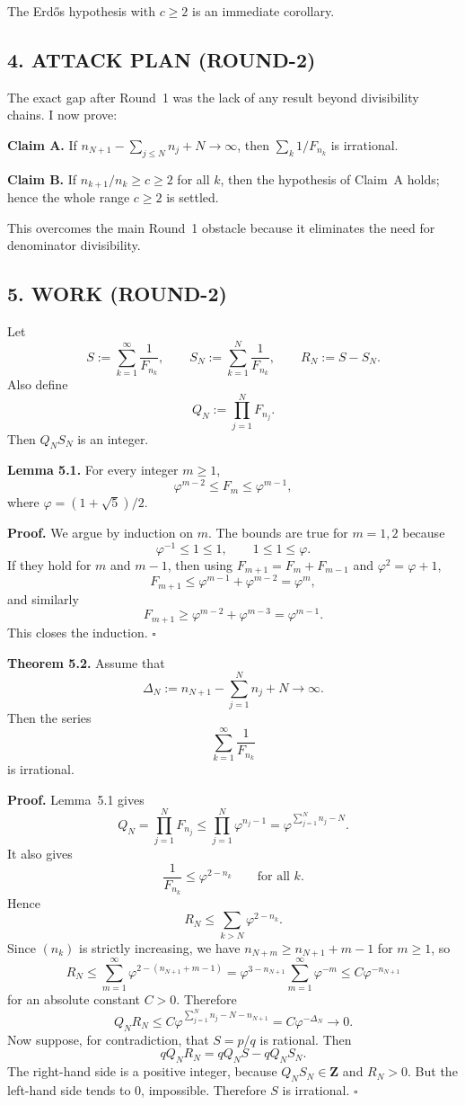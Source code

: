 The Erd\H{o}s hypothesis with $c\ge 2$ is an immediate corollary.

\subsection*{4. ATTACK PLAN (ROUND-2)}

The exact gap after Round~1 was the lack of any result beyond divisibility chains.  I now prove:

\medskip
\noindent
\textbf{Claim A.}
If $n_{N+1}-\sum_{j\le N}n_j+N\to\infty$, then $\sum_k 1/F_{n_k}$ is irrational.

\medskip
\noindent
\textbf{Claim B.}
If $n_{k+1}/n_k\ge c\ge 2$ for all $k$, then the hypothesis of Claim~A holds; hence the whole range $c\ge 2$ is settled.

This overcomes the main Round~1 obstacle because it eliminates the need for denominator divisibility.

\subsection*{5. WORK (ROUND-2)}

Let
\[
S:=\sum_{k=1}^{\infty}\frac{1}{F_{n_k}},
\qquad
S_N:=\sum_{k=1}^{N}\frac{1}{F_{n_k}},
\qquad
R_N:=S-S_N.
\]
Also define
\[
Q_N:=\prod_{j=1}^{N}F_{n_j}.
\]
Then $Q_N S_N$ is an integer.

\medskip
\noindent
\textbf{Lemma 5.1.}
For every integer $m\ge 1$,
\[
\varphi^{m-2}\le F_m\le \varphi^{m-1},
\]
where $\varphi=(1+\sqrt5)/2$.

\medskip
\noindent
\textbf{Proof.}
We argue by induction on $m$.  The bounds are true for $m=1,2$ because
\[
\varphi^{-1}\le 1\le 1,
\qquad
1\le 1\le \varphi.
\]
If they hold for $m$ and $m-1$, then using $F_{m+1}=F_m+F_{m-1}$ and $\varphi^2=\varphi+1$,
\[
F_{m+1}\le \varphi^{m-1}+\varphi^{m-2}=\varphi^m,
\]
and similarly
\[
F_{m+1}\ge \varphi^{m-2}+\varphi^{m-3}=\varphi^{m-1}.
\]
This closes the induction.
\hfill $\square$

\medskip
\noindent
\textbf{Theorem 5.2.}
Assume that
\[
\Delta_N:=n_{N+1}-\sum_{j=1}^{N}n_j+N \to \infty.
\]
Then the series
\[
\sum_{k=1}^{\infty}\frac{1}{F_{n_k}}
\]
is irrational.

\medskip
\noindent
\textbf{Proof.}
Lemma~5.1 gives
\[
Q_N=\prod_{j=1}^{N}F_{n_j}
\le \prod_{j=1}^{N}\varphi^{n_j-1}
=\varphi^{\sum_{j=1}^{N}n_j-N}.
\]
It also gives
\[
\frac{1}{F_{n_k}}\le \varphi^{2-n_k}
\qquad\mbox{for all }k.
\]
Hence
\[
R_N\le \sum_{k>N}\varphi^{2-n_k}.
\]
Since $(n_k)$ is strictly increasing, we have $n_{N+m}\ge n_{N+1}+m-1$ for $m\ge 1$, so
\[
R_N
\le \sum_{m=1}^{\infty}\varphi^{2-(n_{N+1}+m-1)}
=\varphi^{3-n_{N+1}}\sum_{m=1}^{\infty}\varphi^{-m}
\le C\varphi^{-n_{N+1}}
\]
for an absolute constant $C>0$.
Therefore
\[
Q_N R_N
\le C\varphi^{\sum_{j=1}^{N}n_j-N-n_{N+1}}
= C\varphi^{-\Delta_N}
\to 0.
\]
Now suppose, for contradiction, that $S=p/q$ is rational.  Then
\[
qQ_N R_N=qQ_N S-qQ_N S_N.
\]
The right-hand side is a positive integer, because $Q_N S_N\in\mathbf Z$ and $R_N>0$.  But the left-hand side tends to $0$, impossible.  Therefore $S$ is irrational.
\hfill $\square$

